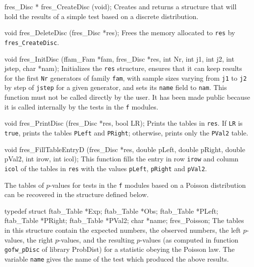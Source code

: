 fres_Disc * fres_CreateDisc (void);
\endcode
 \tab
  Creates and returns a structure that will hold the results
  of a simple test based on a discrete distribution.
 \endtab
\code


void fres_DeleteDisc (fres_Disc *res);
\endcode
 \tab
  Frees the memory allocated to {\tt res} by {\tt fres\_CreateDisc}.
 \endtab
\code
\hide

void fres_InitDisc (ffam_Fam *fam, fres_Disc *res,
                    int Nr, int j1, int j2, int jstep, char *nam);
\endcode
 \tab
   Initializes the {\tt res} structure, ensures that it can keep results
   for the first {\tt Nr} generators of family {\tt fam}, with sample sizes
   varying from {\tt j1} to {\tt j2} by step of {\tt jstep} for a given
   generator, and sets its {\tt name} field to {\tt nam}. This function
   must not be called directly by the user. It has been made public because
   it is called internally by the tests in the {\tt f} modules.
 \endtab
\code
\endhide

void fres_PrintDisc (fres_Disc *res, bool LR);
\endcode
 \tab Prints the tables in {\tt res}. If {\tt LR} is {\tt true}, prints the
   tables {\tt PLeft} and {\tt PRight}; otherwise,
   prints only the {\tt PVal2} table.
 \endtab
\code


void fres_FillTableEntryD (fres_Disc *res, double pLeft, double pRight,
                           double pVal2, int irow, int icol);
\endcode
 \tab This function fills the entry in row {\tt irow} and column {\tt icol}
  of the tables in {\tt res} with the values  {\tt pLeft}, {\tt pRight}
  and {\tt pVal2}.
 \endtab





The tables of $p$-values for tests in the {\tt f} modules based on a
Poisson distribution can be recovered in the structure defined below.

\code

typedef struct {
   ftab_Table *Exp;
   ftab_Table *Obs;
   ftab_Table *PLeft;
   ftab_Table *PRight;
   ftab_Table *PVal2;
   char *name;
} fres_Poisson;
\endcode
 \tab
  The tables in this structure contain the expected numbers, the observed
  numbers, the left $p$-values, the right $p$-values, and the resulting
  $p$-values (as computed in function {\tt gofw\_pDisc} of library
   ProbDist) for a statistic obeying the Poisson law. The variable
  {\tt name} gives the name of the test which produced the above results.
 \endtab
\code



